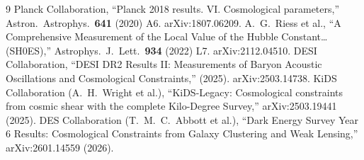 \begin{thebibliography}{9}
Planck Collaboration, ``Planck 2018 results. VI. Cosmological parameters,'' Astron.\ Astrophys.\ \textbf{641} (2020) A6. arXiv:1807.06209.
A.~G.~Riess et al., ``A Comprehensive Measurement of the Local Value of the Hubble Constant\ldots (SH0ES),'' Astrophys.\ J.\ Lett.\ \textbf{934} (2022) L7. arXiv:2112.04510.
DESI Collaboration, ``DESI DR2 Results II: Measurements of Baryon Acoustic Oscillations and Cosmological Constraints,'' (2025). arXiv:2503.14738.
KiDS Collaboration (A.~H.~Wright et al.), ``KiDS-Legacy: Cosmological constraints from cosmic shear with the complete Kilo-Degree Survey,'' arXiv:2503.19441 (2025).
DES Collaboration (T.~M.~C.~Abbott et al.), ``Dark Energy Survey Year 6 Results: Cosmological Constraints from Galaxy Clustering and Weak Lensing,'' arXiv:2601.14559 (2026).


\end{thebibliography}
